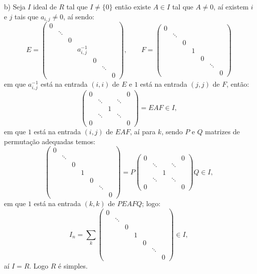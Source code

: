 \documentclass[10pt,a4paper]{article}
\begin{document}
\medskip
\noindent
b) Seja $I$ ideal de $R$ tal que $I\neq\{0\}$ então existe $A\in I$ tal que $A\neq 0$, aí existem $i$ e $j$ tais que $a_{i,j}\neq 0$, aí sendo:
\[
E=\begin{pmatrix}
0&&&&&&\\&\ddots&&&&&\\&&0&&&&\\&&&a_{i,j}^{-1}&&&\\&&&&0&&\\&&&&&\ddots&\\&&&&&&0
\end{pmatrix},\quad\quad F=\begin{pmatrix}
0&&&&&&\\&\ddots&&&&&\\&&0&&&&\\&&&1&&&\\&&&&0&&\\&&&&&\ddots&\\&&&&&&0
\end{pmatrix}
\]
em que $a_{i,j}^{-1}$ está na entrada $(i,i)$ de $E$ e $1$ está na entrada $(j,j)$ de $F$, então:
\[
\begin{pmatrix}
0&&&&0\\&\ddots&&\ddots&\\&&1&&\\&\ddots&&\ddots&\\0&&&&0
\end{pmatrix}=EAF\in I,
\]
em que $1$ está na entrada $(i,j)$ de $EAF$, aí para $k$, sendo $P$ e $Q$ matrizes de permutação adequadas temos:
\[
\begin{pmatrix}
0&&&&&&\\&\ddots&&&&&\\&&0&&&&\\&&&1&&&\\&&&&0&&\\&&&&&\ddots&\\&&&&&&0
\end{pmatrix}=P\begin{pmatrix}
0&&&&0\\&\ddots&&\ddots&\\&&1&&\\&\ddots&&\ddots&\\0&&&&0
\end{pmatrix}Q\in I,
\]
em que $1$ está na entrada $(k,k)$ de $PEAFQ$; logo:
\[
I_n=\sum_k\begin{pmatrix}
0&&&&&&\\&\ddots&&&&&\\&&0&&&&\\&&&1&&&\\&&&&0&&\\&&&&&\ddots&\\&&&&&&0
\end{pmatrix}\in I,
\]
aí $I=R$. Logo $R$ é simples.
\end{document}
